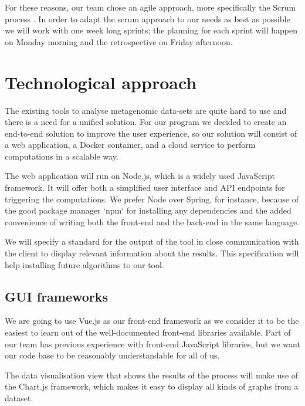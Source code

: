 \documentclass{report}
\begin{document}
For these reasons, our team chose an agile approach, more specifically the Scrum process \cite{schwaber2004agile}. In order to adapt the scrum approach to our needs as best as possible we will work with one week long sprints; the planning for each sprint will happen on Monday morning and the retrospective on Friday afternoon. 


\section{Technological approach}
The existing tools to analyse metagenomic data-sets are quite hard to use and there is a need for a unified solution. For our program we decided to create an end-to-end solution to improve the user experience, so our solution will consist of a web application, a Docker container, and a cloud service to perform computations in a scalable way.

The web application will run on Node.js, which is a widely used JavaScript framework. It will offer both a simplified user interface and API endpoints for triggering the computations. We prefer Node over Spring, for instance, because of the good package manager `npm` for installing any dependencies and the added convenience of writing both the front-end and the back-end in the same language.

We will specify a standard for the output of the tool in close communication with the client to display relevant information about the results. This specification will help installing future algorithms to our tool.


\subsection{GUI frameworks}
We are going to use Vue.js as our front-end framework as we consider it to be the easiest to learn out of the well-documented front-end libraries available. Part of our team has previous experience with front-end JavaScript libraries, but we want our code base to be reasonably understandable for all of us.
 
The data visualisation view that shows the results of the process will make use of the Chart.js framework, which makes it easy to display all kinds of graphs from a dataset.
\end{document}
